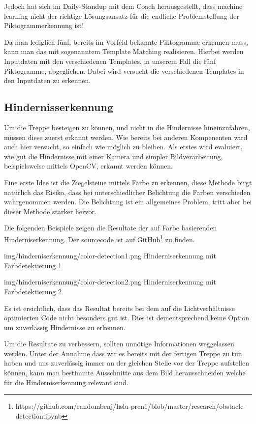 Jedoch hat sich im Daily-Standup mit dem Coach herausgestellt, dass machine learning nicht der richtige Lösungsansatz für die endliche Problemstellung der Piktogrammerkennung ist! 

Da man lediglich fünf, bereits im Vorfeld bekannte Piktogramme erkennen muss, kann man das mit sogenanntem Template Matching\cite{OpenCV-Template-Matching} realisieren. Hierbei werden Inputdaten mit den verschiedenen Templates, in unserem Fall die fünf Piktogramme, abgeglichen. Dabei wird versucht die verschiedenen Templates in den Inputdaten zu erkennen. 


\subsection{Hindernisserkennung}

Um die Treppe besteigen zu können, und nicht in die Hindernisse hineinzufahren, müssen
diese zuerst erkannt werden. Wie bereits bei anderen Kompenenten wird auch hier versucht, so einfach wie möglich zu bleiben.
Als erstes wird evaluiert, wie gut die Hindernisse mit einer Kamera
und simpler Bildverarbeitung, beispielsweise mittels OpenCV\cite{OpenCV}, erkannt werden
können.

Eine erste Idee ist die Ziegelsteine mittels Farbe zu erkennen, diese Methode
birgt natürlich das Risiko, dass bei unterschiedlicher Belichtung die 
Farben verschieden wahrgenommen werden. Die Belichtung ist ein allgemeines Problem,
tritt aber bei dieser Methode stärker hervor.

Die folgenden Beispiele zeigen die Resultate der auf Farbe basierenden 
Hinderniserkennung. Der sourcecode ist auf GitHub\footnote{https://github.com/randombenj/hslu-pren1/blob/master/research/obstacle-detection.ipynb} zu finden.

\image
  {img/hinderniserkennung/color-detection1.png}
  {Hinderniserkennung mit Farbdetektierung 1}

\image
  {img/hinderniserkennung/color-detection2.png}
  {Hinderniserkennung mit Farbdetektierung 2}

Es ist ersichtlich, dass das Resultat bereits bei dem auf die Lichtverhältnisse optimierten
Code nicht besonders gut ist. Dies ist dementsprechend keine Option um
zuverlässig Hindernisse zu erkennen.

Um die Resultate zu verbessern, sollten unnötige Informationen weggelassen werden.
Unter der Annahme dass wir es bereits mit der fertigen Treppe zu tun haben
und uns zuverlässig immer an der gleichen Stelle vor der Treppe
aufstellen können, kann man bestimmte Ausschnitte aus dem Bild herausschneiden
welche für die Hinderniserkennung relevant sind.
\newpage

